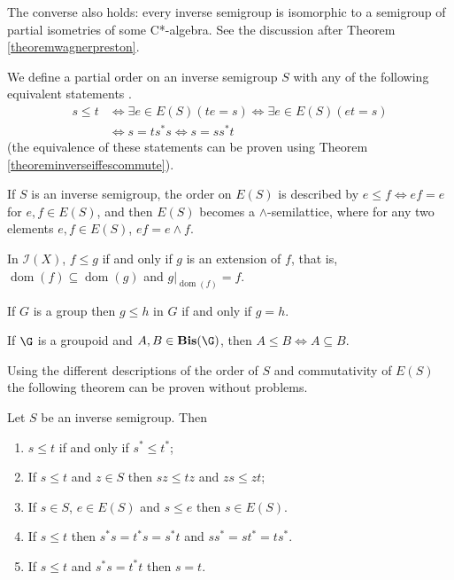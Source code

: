 The converse also holds: every inverse semigroup is isomorphic to a semigroup of partial isometries of some C*-algebra. See the discussion after Theorem \ref{theoremwagnerpreston}.

We define a partial order on an inverse semigroup $S$ with any of the following equivalent statements .\label{orderinversesemigroup}
\begin{align*}
s\leq t&\iff\exists e\in E(S)\left(te=s\right)\iff\exists e\in E(S)(et=s)\\
&\iff s=ts^*s\iff s=ss^*t
\end{align*}
(the equivalence of these statements can be proven using Theorem \ref{theoreminverseiffescommute}).

\begin{example}
If $S$ is an inverse semigroup, the order on $E(S)$ is described by $e\leq f\iff ef=e$ for $e,f\in E(S)$, and then $E(S)$ becomes a $\wedge$-semilattice, where for any two elements $e,f\in E(S)$, $ef=e\land f$.
\end{example}


\begin{example}
In $\mathcal{I}(X)$, $f\leq g$ if and only if $g$ is an extension of $f$, that is, $\operatorname{dom}(f)\subseteq\operatorname{dom}(g)$ and $g|_{\operatorname{dom}(f)}=f$.
\end{example}

\begin{example}
If $G$ is a group then $g\leq h$ in $G$ if and only if $g=h$.
\end{example}

\begin{example}
If $\G$ is a groupoid and $A,B\in\operatorname{\bf Bis}(\G)$, then $A\leq B\iff A\subseteq B$.
\end{example}

Using the different descriptions of the order of $S$ and commutativity of $E(S)$ the following theorem can be proven without problems.

\begin{theorem}\label{theoremorder}
Let $S$ be an inverse semigroup. Then
\begin{enumerate}
\item[(a)] $s\leq t$ if and only if $s^*\leq t^*$;
\item[(b)] If $s\leq t$ and $z\in S$ then  $sz\leq tz$ and $zs\leq zt$;
\item[(c)] If $s\in S$, $e\in E(S)$ and $s\leq e$ then $s\in E(S)$.
\item[(d)] If $s\leq t$ then $s^*s=t^*s=s^*t$ and $ss^*=st^*=ts^*$.
\item[(e)] If $s\leq t$ and $s^*s=t^*t$ then $s=t$.
\end{enumerate}
\end{theorem}

